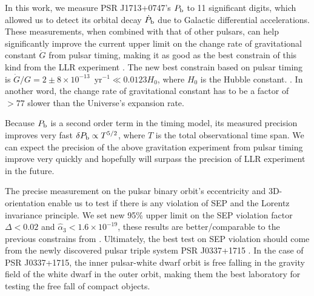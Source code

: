In this work, we measure PSR J1713+0747's $P_{\rm b}$ to 11 significant
digits, which allowed us to detect its orbital decay $\dot{P}_{\rm b}$ due to Galactic differential accelerations.
These measurements, when combined with that of other pulsars, can help
significantly improve the current upper limit on the change rate of gravitational
 constant $\dot{G}$ from pulsar timing, making it as good as the best
constrain of this kind from the LLR experiment \citep{hmb10}.
The new best constrain based on pulsar timing is $\dot{G}/G
=2\pm8\times10^{-13}$~yr$^{-1}\ll0.0123H_0$, where $H_0$ is the Hubble constant. . 
In another word, the change rate of gravitational constant has to be a factor
of $>77$ slower than the Universe's expansion rate.

Because $P_{\rm b}$ is a second order term in the timing 
model, its measured precision improves very fast $\delta
P_{\rm b} \propto T^{5/2}$, where $T$ is the total observational time span.
We can expect the precision of the above gravitation experiment from pulsar
timing improve very quickly and hopefully will surpass the precision of LLR
experiment in the future.

The precise measurement on the pulsar binary orbit's eccentricity and
3D-orientation enable us to test if there is any violation of SEP and the
Lorentz invariance principle. We set new 95\% upper limit on the SEP violation
factor $\Delta <0.02$ and $\hat{\alpha}_3<1.6\times10^{-19}$, these results are better/comparable
to the previous constrains from \citealt{wex00, sns+05, sfl+05, gsf+11}.
Ultimately, the best test on SEP violation should come from the newly
discovered pulsar triple system PSR J0337+1715 \citep{rsa+14}. In the case of
PSR J0337+1715, the
inner pulsar-white dwarf orbit is free falling in the gravity field of the
white dwarf in the outer orbit, making them the best laboratory for testing
the free fall of compact objects.



